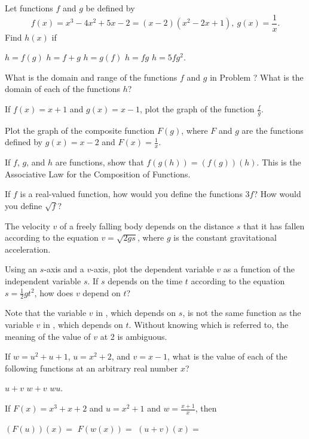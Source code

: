 \begin{exercises}

Let functions $f$ and $g$ be defined by
\[
f(x)=x^3-4x^2+5x-2= (x-2)(x^2-2x+1),\ g(x) = \frac1x
.
\]
Find $h(x)$ if
\begin{exenum}
\sx
$h=f(g)$
\sx
$h=f+g$
\sx
$h=g(f)$
\sx
$h=fg$
\sx
$h=5fg^2$.
\end{exenum}

What is the domain and range of the functions $f$ and $g$
in Problem ?
What is the domain of each of the functions $h$?

If $f(x)=x+1$ and $g(x) = x-1$, plot the graph of the function
$\frac fg$.

Plot the graph of the composite function $F(g)$, where
$F$ and $g$ are the functions defined by
$g(x) = x-2$ and $F(x)= \frac1x$.

If $f$, $g$, and $h$ are functions, show that $f(g(h)) = (f(g))(h)$.
This is the Associative Law for the Composition of Functions.

If $f$ is a real-valued function, how would you define the functions $3f$?
How would you define $\sqrt f$?

The velocity $v$ of a freely falling body depends on the distance
$s$ that it has fallen according to the equation $v = \sqrt{2gs}$,
where $g$ is the constant gravitational acceleration.
\begin{exenum}
\sx
{}
Using an $s$-axis and a $v$-axis, plot the dependent variable $v$
as a function of the independent variable $s$.
\sx
{}
If $s$ depends on the time $t$ according to the equation
$s=\frac12gt^2$, how does $v$ depend on $t$?
\end{exenum}
Note that the variable $v$ in ,
which depends on $s$, is not the same function as the
variable $v$ in , which depends on $t$.
Without knowing which is referred to, the meaning of the value of
$v$ at 2 is ambiguous.

If $w = u^2 + u + 1$, $u = x^2 + 2$, and $v = x - 1$, what is the value
of each of the following functions at an arbitrary real number $x$?
\begin{exenum}
\sx
$u + v$
\sx
$w + v$
\sx
$wu$.
\end{exenum}

If $F(x) = x^3 + x + 2$ and $u = x^2 +1$ and $w = \frac{x+1}x$, then
\begin{exenum}
\sx
$(F(u))(x)=$
\sx
$F(w(x))=$
\sx
$(u+v)(x)=$
\end{exenum}


\end{exercises}
